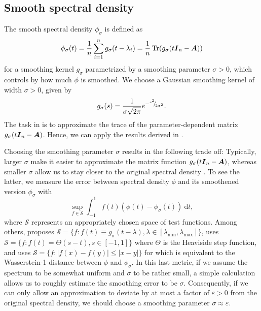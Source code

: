 \documentclass[12pt]{article}
\begin{document}
\subsection{Smooth spectral density}
\label{subsec:spectral-density}

The smooth spectral density $\phi_{\sigma}$ is defined as
\begin{equation}
    \phi_{\sigma}(t) = \frac{1}{n} \sum_{i=1}^{n} g_{\sigma}(t - \lambda_i) = \frac{1}{n} \operatorname{Tr}(g_{\sigma}(t\boldsymbol{I}_n - \boldsymbol{A}))
    \label{equ:smooth-spectral-density}
\end{equation}
for a smoothing kernel $g_{\sigma}$ parametrized by a smoothing parameter $\sigma > 0$, which controls by how much $\phi$ is smoothed. We choose a Gaussian smoothing kernel of width $\sigma > 0$, given by
\begin{equation}
    g_{\sigma}(s) = \frac{1}{\sigma \sqrt{2\pi}} e^{-{}^{s^2}{\mskip -5mu/\mskip -3mu}_{2\sigma^2}}.
    \label{equ:smoothing-kernel}
\end{equation}
The task in  is to approximate the trace of the parameter-dependent matrix $g_{\sigma}(t\boldsymbol{I}_n - \boldsymbol{A})$. Hence, we can apply the results derived in .

Choosing the smoothing parameter $\sigma$ results in the following trade off: Typically, larger $\sigma$ make it easier to approximate the matrix function $g_{\sigma}(t\boldsymbol{I}_n - \boldsymbol{A})$, whereas smaller $\sigma$ allow us to stay closer to the original spectral density . To see the latter, we measure the error between spectral density $\phi$ and its smoothened version $\phi_{\sigma}$ with
\begin{equation}
    \sup_{f \in \mathcal{S}} \int_{-1}^{1} f(t) (\phi(t) - \phi_{\sigma}(t))~\mathrm{d}t,
    \label{equ:error-metric}
\end{equation}
where $\mathcal{S}$ represents an appropriately chosen space of test functions. Among others, \cite{lin-2016-approximating-spectral} proposes $\mathcal{S} = \{ f: f(t) \equiv g_{\sigma}(t - \lambda), \lambda \in [\lambda_{\text{min}}, \lambda_{\text{max}}]\}$, \cite{chen-2021-analysis-stochastic} uses $\mathcal{S} = \{f : f(t) = \Theta(s - t), s \in [-1, 1] \}$ where $\Theta$ is the Heaviside step function, and \cite{braverman-2022-sublinear-time} uses $\mathcal{S} = \{f : |f(x) - f(y)| \leq |x - y| \}$ for which  is equivalent to the Wasserstein-1 distance between $\phi$ and $\phi_{\sigma}$. In this last metric, if we assume the spectrum to be somewhat uniform and $\sigma$ to be rather small, a simple calculation allows us to roughly estimate the smoothing error  to be $\sigma$. Consequently, if we can only allow an approximation to deviate by at most a factor of $\varepsilon > 0$ from the original spectral density, we should choose a smoothing parameter $\sigma \approx \varepsilon$.
\end{document}
